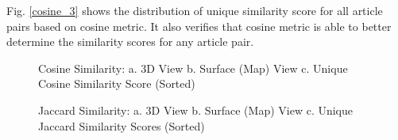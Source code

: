\documentclass[journal,onecolumn]{IEEEtran}
\begin{document}
Fig. \ref{cosine_3} shows the distribution of unique similarity score for all article pairs based on cosine metric. It also verifies that cosine metric is able to better determine the similarity scores for any article pair.

\begin{figure}[h]
\begin{center}
\label{thr}
\caption{  Cosine Similarity: a. 3D View  b. Surface (Map) View c. Unique Cosine Similarity Score (Sorted)}
\end{center}
\end{figure}

\begin{figure}[h]
\begin{center}
\label{thr}
\caption{ Jaccard Similarity: a. 3D View b. Surface (Map) View c. Unique Jaccard Similarity Scores (Sorted)}
\end{center}
\end{figure}
\end{document}
